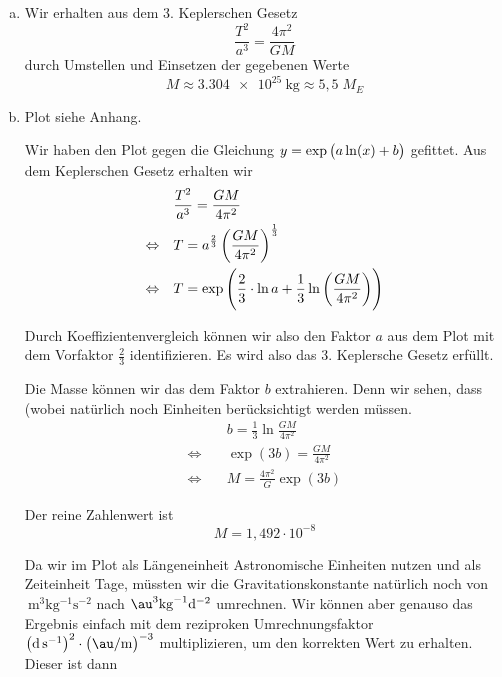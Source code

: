 \documentclass[a4paper,german,12pt,smallheadings]{scrartcl}
\begin{document}
\begin{enumerate}[a)]
  \item
    Wir erhalten aus dem 3. Keplerschen Gesetz
    \begin{equation}
      \frac{T^2}{a^3} = \frac{4 \pi^2}{G M}
    \end{equation}
    durch Umstellen und Einsetzen der gegebenen Werte
    \begin{equation}
      M \approx \SI{3.304e25}{\kilogram} \approx 5{,}5 \; M_E
    \end{equation}
  \item
    Plot siehe Anhang.

    Wir haben den Plot gegen die Gleichung $y = \exp\del{a \ln(x) + b}$
    gefittet. Aus dem Keplerschen Gesetz erhalten wir
    \begin{align}
      &\frac{T^2}{a^3} = \frac{GM}{4 \pi^2} \\
      \Leftrightarrow\quad
      & T = a^\frac{2}{3} \del{\frac{GM}{4 \pi^2}}^\frac{1}{3} \\
      \Leftrightarrow\quad
      & T = \exp\del{ \frac{2}{3} \cdot \ln a + \frac{1}{3} \ln \del{\frac{GM}{4 \pi^2}}}
    \end{align}

    Durch Koeffizientenvergleich können wir also den Faktor $a$ aus dem Plot
    mit dem Vorfaktor $\frac{2}{3}$ identifizieren. Es wird also das 3.
    Keplersche Gesetz erfüllt.

    Die Masse können wir das dem Faktor $b$ extrahieren. Denn wir sehen, dass
    (wobei natürlich noch Einheiten berücksichtigt werden müssen.
    \begin{align}
      &b = \frac{1}{3} \ln \frac{GM}{4 \pi^2} \\
      \Leftrightarrow\quad
      &\exp(3b) = \frac{GM}{4 \pi^2} \\
      \Leftrightarrow\quad
      & M = \frac{4 \pi^2}{G} \exp(3b)
    \end{align}

    Der reine Zahlenwert ist
    \begin{equation}
      M = 1{,}492 \cdot 10^{-8}
    \end{equation}

    Da wir im Plot als Längeneinheit Astronomische Einheiten nutzen und als
    Zeiteinheit Tage, müssten wir die Gravitationskonstante natürlich noch von
    $\SI{}{\meter^3\kilogram^{-1}\second^{-2}}$ nach
    $\SI{}{\au^3\kilogram^{-1}\day^{-2}}$ umrechnen. Wir können aber genauso
    das Ergebnis einfach mit dem reziproken Umrechnungsfaktor
    $\del{\SI{}{\day\per\second}}^2 \cdot \del{\SI{}{\au\per\meter}}^{-3}$
    multiplizieren, um den korrekten Wert zu erhalten. Dieser ist dann


\end{enumerate}
\end{document}
